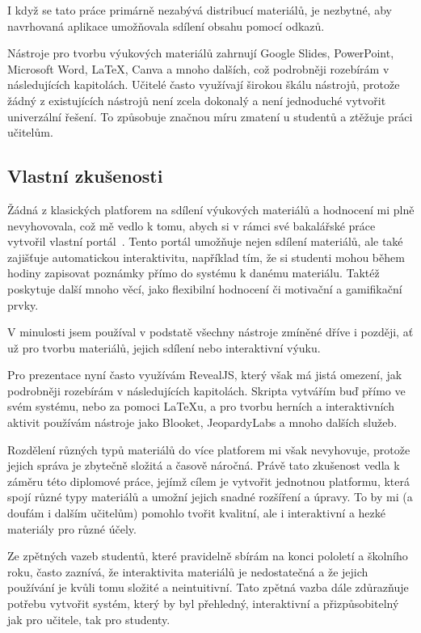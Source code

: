 I když se tato práce primárně nezabývá distribucí materiálů, je nezbytné, aby navrhovaná aplikace umožňovala sdílení obsahu pomocí odkazů.

Nástroje pro tvorbu výukových materiálů zahrnují Google Slides, PowerPoint, Microsoft Word, \LaTeX, Canva a mnoho dalších, což podrobněji rozebírám v následujících kapitolách.
Učitelé často využívají širokou škálu nástrojů, protože žádný z existujících nástrojů není zcela dokonalý a není jednoduché vytvořit univerzální řešení.
To způsobuje značnou míru zmatení u studentů a ztěžuje práci učitelům.

\subsection{Vlastní zkušenosti}

Žádná z klasických platforem na sdílení výukových materiálů a hodnocení mi plně nevyhovovala, což mě vedlo k tomu, abych si v rámci své bakalářské práce vytvořil vlastní portál~\cite{cajthaml_bp}.
Tento portál umožňuje nejen sdílení materiálů, ale také zajišťuje automatickou interaktivitu, například tím, že si studenti mohou během hodiny zapisovat poznámky přímo do systému k danému materiálu.
Taktéž poskytuje další mnoho věcí, jako flexibilní hodnocení či motivační a gamifikační prvky.

V minulosti jsem používal v podstatě všechny nástroje zmíněné dříve i později, ať už pro tvorbu materiálů, jejich sdílení nebo interaktivní výuku.

Pro prezentace nyní často využívám RevealJS, který však má jistá omezení, jak podrobněji rozebírám v následujících kapitolách.
Skripta vytvářím buď přímo ve svém systému, nebo za pomoci LaTeXu, a pro tvorbu herních a interaktivních aktivit používám nástroje jako Blooket, JeopardyLabs a mnoho dalších služeb.

Rozdělení různých typů materiálů do více platforem mi však nevyhovuje, protože jejich správa je zbytečně složitá a časově náročná.
Právě tato zkušenost vedla k záměru této diplomové práce, jejímž cílem je vytvořit jednotnou platformu, která spojí různé typy materiálů a umožní jejich snadné rozšíření a úpravy.
To by mi (a doufám i dalším učitelům) pomohlo tvořit kvalitní, ale i interaktivní a hezké materiály pro různé účely.

Ze zpětných vazeb studentů, které pravidelně sbírám na konci pololetí a školního roku, často zaznívá, že interaktivita materiálů je nedostatečná a že jejich používání je kvůli tomu složité a neintuitivní.
Tato zpětná vazba dále zdůrazňuje potřebu vytvořit systém, který by byl přehledný, interaktivní a přizpůsobitelný jak pro učitele, tak pro studenty.

